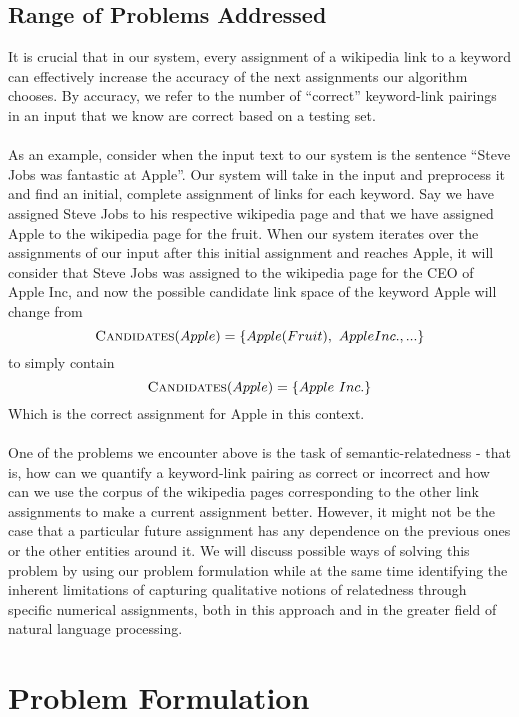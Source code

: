 \documentclass[twoside,11pt]{article}
\begin{document}
\subsection{Range of Problems Addressed}

It is crucial that in our system, every assignment of a wikipedia link to a keyword can effectively increase the accuracy of the next assignments our algorithm chooses. By accuracy, we refer to the number of ``correct'' keyword-link pairings in an input that we know are correct based on a testing set.
\\ \\
As an example, consider when the input text to our system is the sentence ``Steve Jobs was fantastic at Apple''. Our system will take in the input and preprocess it and find an initial, complete assignment of links for each keyword. Say we have assigned Steve Jobs to his respective wikipedia page and that we have assigned Apple to the wikipedia page for the fruit. When our system iterates over the assignments of our input after this initial assignment and reaches Apple, it will consider that Steve Jobs was assigned to the wikipedia page for the CEO of Apple Inc, and now the possible candidate link space of the keyword Apple will change from
$$\mbox{{\sc Candidates}}(Apple) = \{Apple (Fruit), \ Apple Inc., ...\}$$
to simply contain
$$\mbox{{\sc Candidates}}(Apple) = \{Apple \ Inc.\}$$
Which is the correct assignment for Apple in this context.
\\ \\
One of the problems we encounter above is the task of semantic-relatedness - that is, how can we quantify a keyword-link pairing as correct or incorrect and how can we use the corpus of the wikipedia pages corresponding to the other link assignments to make a current assignment better. However, it might not be the case that a particular future assignment has any dependence on the previous ones or the other entities around it. We will discuss possible ways of solving this problem by using our problem formulation while at the same time identifying the inherent limitations of capturing qualitative notions of relatedness through specific numerical assignments, both in this approach and in the greater field of natural language processing.

\section{Problem Formulation}
\end{document}

